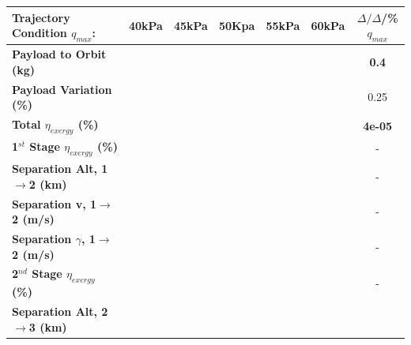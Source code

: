 \begin{table}[ht]
	\centering
	\begin{tabular}{l c c c c c c} 
		\hline \textbf{Trajectory Condition}   \qquad  $q_{max}$:
		&40kPa
		&45kPa
		&50Kpa
		&55kPa
		&60kPa
		& $\Delta/\Delta$/\%$q_{max}$
		\\
		\hline \textbf{Payload to Orbit (kg)}
		& \textbf{\PayloadToOrbitqForty}
		& \textbf{\PayloadToOrbitqFortyFive}
		& \textbf{\PayloadToOrbitqStandard}
		& \textbf{\PayloadToOrbitqFiftyFive}
		& \textbf{\PayloadToOrbitqSixty}
		&\textbf{0.4}
		\\
		\textbf{Payload Variation (\%)}
		& \PayloadVarqForty
		& \PayloadVarqFortyFive
		& \PayloadVarqStandard
		& \PayloadVarqFiftyFive
		& \PayloadVarqSixty
		&0.25
		\\
		\textbf{Total $\eta_{exergy}$ (\%)}
		& \textbf{\totalExergyEffqForty}
		& \textbf{\totalExergyEffqFortyFive}
		& \textbf{\totalExergyEffqStandard}
		& \textbf{\totalExergyEffqFiftyFive}
		& \textbf{\totalExergyEffqSixty}
		& \textbf{4e-05}
		\\
		\hline 
		\textbf{1$^{st}$ Stage $\eta_{exergy}$ (\%)}
		& \textbf{\firstExergyEffqForty}
		& \textbf{\firstExergyEffqFortyFive}
		& \textbf{\firstExergyEffqStandard}
		& \textbf{\firstExergyEffqFiftyFive}
		& \textbf{\firstExergyEffqSixty}
		& -
		\\
		\textbf{Separation Alt, 1$\rightarrow$2 (km)}
		& \firstsecondSeparationAltqForty
		& \firstsecondSeparationAltqFortyFive
		& \firstsecondSeparationAltqStandard
		& \firstsecondSeparationAltqFiftyFive
		& \firstsecondSeparationAltqSixty
		& -
		\\
		\textbf{Separation v, 1$\rightarrow$2 (m/s)}
		& \firstsecondSeparationvqForty
		& \firstsecondSeparationvqFortyFive
		& \firstsecondSeparationvqStandard
		& \firstsecondSeparationvqFiftyFive
		& \firstsecondSeparationvqSixty
		& -
		\\
		\textbf{Separation $\gamma$, 1$\rightarrow$2 (m/s)}
		& \firstsecondSeparationgammaqForty
		& \firstsecondSeparationgammaqFortyFive
		& \firstsecondSeparationgammaqStandard
		& \firstsecondSeparationgammaqFiftyFive
		& \firstsecondSeparationgammaqSixty
		& -
		\\
		\hline 
		\textbf{2$^{nd}$ Stage $\eta_{exergy}$ (\%)}
		& \textbf{\secondExergyEffqForty}
		& \textbf{\secondExergyEffqFortyFive}
		& \textbf{\secondExergyEffqStandard}
		& \textbf{\secondExergyEffqFiftyFive}
		& \textbf{\secondExergyEffqSixty}
		& -
		\\
		\textbf{Separation Alt, 2$\rightarrow$3 (km)}

\end{tabular}
\end{table}
